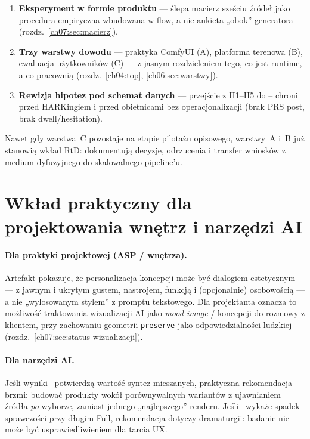 \begin{enumerate}
  \item \textbf{Eksperyment w formie produktu} --- ślepa macierz sześciu źródeł jako procedura empiryczna wbudowana w flow, a nie ankieta „obok” generatora (rozdz.~\ref{ch07:sec:macierz}).
  \item \textbf{Trzy warstwy dowodu} --- praktyka ComfyUI (A), platforma terenowa (B), ewaluacja użytkowników (C) --- z jasnym rozdzieleniem tego, co jest runtime, a co pracownią (rozdz.~\ref{ch04:top}, \ref{ch06:sec:warstwy}).
  \item \textbf{Rewizja hipotez pod schemat danych} --- przejście z H1--H5 do -- chroni przed HARKingiem i przed obietnicami bez operacjonalizacji (brak PRS post, brak dwell/hesitation).
\end{enumerate}

Nawet gdy warstwa~C pozostaje na etapie pilotażu opisowego, warstwy~A i~B już stanowią wkład RtD: dokumentują decyzje, odrzucenia i transfer wniosków z medium dyfuzyjnego do skalowalnego pipeline'u.

\section{Wkład praktyczny dla projektowania wnętrz i narzędzi AI}
\label{ch09:sec:praktyka}

\paragraph{Dla praktyki projektowej (ASP / wnętrza).}
Artefakt pokazuje, że personalizacja koncepcji może być dialogiem estetycznym --- z jawnym i ukrytym gustem, nastrojem, funkcją i (opcjonalnie) osobowością --- a nie „wylosowanym stylem” z promptu tekstowego.
Dla projektanta oznacza to możliwość traktowania wizualizacji AI jako \emph{mood image} / koncepcji do rozmowy z klientem, przy zachowaniu geometrii \texttt{preserve} jako odpowiedzialności ludzkiej (rozdz.~\ref{ch07:sec:status-wizualizacji}).

\paragraph{Dla narzędzi AI.}
Jeśli wyniki~ potwierdzą wartość syntez mieszanych, praktyczna rekomendacja brzmi: budować produkty wokół porównywalnych wariantów z ujawnianiem źródła \emph{po} wyborze, zamiast jednego „najlepszego” renderu.
Jeśli~ wykaże spadek sprawczości przy długim Full, rekomendacja dotyczy dramaturgii: badanie nie może być usprawiedliwieniem dla tarcia UX.

